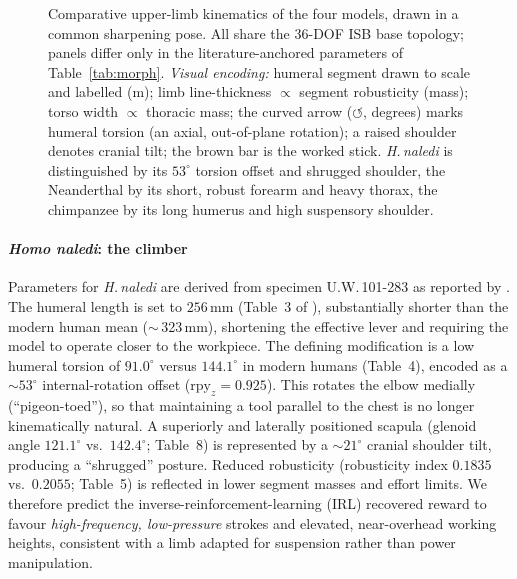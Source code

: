   \begin{figure}[t]
  \centering
  \caption{Comparative upper-limb kinematics of the four models, drawn in a
  common sharpening pose. All share the 36-DOF ISB base topology; panels differ
  only in the literature-anchored parameters of Table~\ref{tab:morph}.
  \emph{Visual encoding:} humeral segment drawn to scale and labelled (m);
  limb line-thickness $\propto$ segment robusticity (mass); torso width
  $\propto$ thoracic mass; the curved arrow ($\circlearrowleft$, degrees) marks
  humeral torsion (an axial, out-of-plane rotation); a raised shoulder denotes
  cranial tilt; the brown bar is the worked stick. \textit{H.\,naledi} is
  distinguished by its $53^\circ$ torsion offset and shrugged shoulder, the
  Neanderthal by its short, robust forearm and heavy thorax, the chimpanzee by
  its long humerus and high suspensory shoulder.}
  \label{fig:morph}
  \end{figure}

  \paragraph{\textit{Homo naledi}: the climber}
  Parameters for \textit{H.\,naledi} are derived from specimen U.W.\,101-283 as
  reported by \citet{feuerriegel2017}. The humeral length is set to
  $256$\,mm (Table~3 of \citealp{feuerriegel2017}), substantially shorter than
  the modern human mean ($\sim$\,323\,mm), shortening the effective lever and
  requiring the model to operate closer to the workpiece. The defining
  modification is a low humeral torsion of $91.0^\circ$ versus $144.1^\circ$ in
  modern humans (Table~4), encoded as a $\sim$$53^\circ$ internal-rotation offset
  ($\mathrm{rpy}_z = 0.925$). This rotates the elbow medially (``pigeon-toed''),
  so that maintaining a tool parallel to the chest is no longer kinematically
  natural. A superiorly and laterally positioned scapula
  (glenoid angle $121.1^\circ$ vs.\ $142.4^\circ$; Table~8) is represented by a
  $\sim$$21^\circ$ cranial shoulder tilt, producing a ``shrugged'' posture.
  Reduced robusticity (robusticity index $0.1835$ vs.\ $0.2055$; Table~5) is
  reflected in lower segment masses and effort limits. We therefore predict the
  inverse-reinforcement-learning (IRL) recovered reward to favour
  \emph{high-frequency, low-pressure} strokes and elevated, near-overhead working
  heights, consistent with a limb adapted for suspension rather than power
  manipulation.

